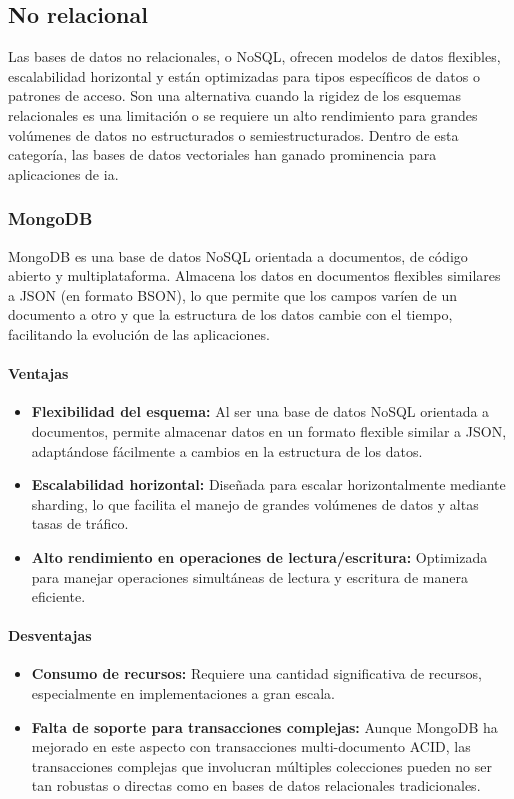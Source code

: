 \subsection{No relacional}
Las bases de datos no relacionales, o NoSQL, ofrecen modelos de datos flexibles, escalabilidad horizontal y están optimizadas para tipos específicos de datos o patrones de acceso. Son una alternativa cuando la rigidez de los esquemas relacionales es una limitación o se requiere un alto rendimiento para grandes volúmenes de datos no estructurados o semiestructurados. Dentro de esta categoría, las bases de datos vectoriales han ganado prominencia para aplicaciones de \gls{ia}.

\subsubsection{MongoDB}
MongoDB es una base de datos NoSQL orientada a documentos, de código abierto y multiplataforma. Almacena los datos en documentos flexibles similares a JSON (en formato BSON), lo que permite que los campos varíen de un documento a otro y que la estructura de los datos cambie con el tiempo, facilitando la evolución de las aplicaciones.

\paragraph{Ventajas}
\begin{itemize}
    \item \textbf{Flexibilidad del esquema:} Al ser una base de datos NoSQL orientada a documentos, permite almacenar datos en un formato flexible similar a JSON, adaptándose fácilmente a cambios en la estructura de los datos.
    \item \textbf{Escalabilidad horizontal:} Diseñada para escalar horizontalmente mediante sharding, lo que facilita el manejo de grandes volúmenes de datos y altas tasas de tráfico.
    \item \textbf{Alto rendimiento en operaciones de lectura/escritura:} Optimizada para manejar operaciones simultáneas de lectura y escritura de manera eficiente.
\end{itemize}

\paragraph{Desventajas}
\begin{itemize}
    \item \textbf{Consumo de recursos:} Requiere una cantidad significativa de recursos, especialmente en implementaciones a gran escala.
    \item \textbf{Falta de soporte para transacciones complejas:} Aunque MongoDB ha mejorado en este aspecto con transacciones multi-documento ACID, las transacciones complejas que involucran múltiples colecciones pueden no ser tan robustas o directas como en bases de datos relacionales tradicionales.
\end{itemize}

